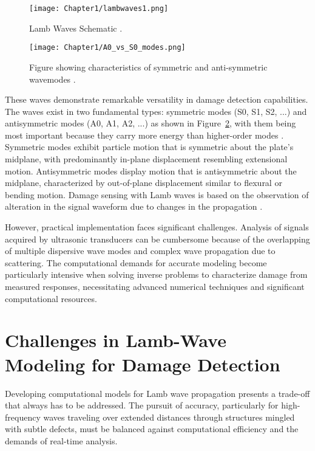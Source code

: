 \documentclass[12pt,a4paper]{report}
\begin{document}
\begin{figure}[htbp]
    \centering
    \texttt{[image: Chapter1/lambwaves1.png]}
    \caption{Lamb Waves Schematic \citep{rose2014ultrasonic}.}
    \label{fig:fig1}
\end{figure}

\begin{figure}[htbp]
    \centering
    \texttt{[image: Chapter1/A0\_vs\_S0\_modes.png]}
    \caption{Figure showing characteristics of symmetric and anti-symmetric wavemodes \citep{rose2014ultrasonic}.}
    \label{fig:S0andA0}
\end{figure}

\FloatBarrier   %

These waves demonstrate remarkable versatility in damage detection capabilities. The waves exist in two fundamental types: symmetric modes (S0, S1, S2, ...) and antisymmetric modes (A0, A1, A2, ...) as shown in Figure~\ref{fig:S0andA0}, with them being most important because they carry more energy than higher-order modes \citep{GIURGIUTIU2014293}. Symmetric modes exhibit particle motion that is symmetric about the plate's midplane, with predominantly in-plane displacement resembling extensional motion. Antisymmetric modes display motion that is antisymmetric about the midplane, characterized by out-of-plane displacement similar to flexural or bending motion. Damage sensing with Lamb waves is based on the observation of alteration in the signal waveform due to changes in the propagation  \citep{Muller2017}. 



However, practical implementation faces significant challenges. Analysis of signals acquired by ultrasonic transducers can be cumbersome because of the overlapping of multiple dispersive wave modes and complex wave propagation due to scattering. The computational demands for accurate modeling become particularly intensive when solving inverse problems to characterize damage from measured responses, necessitating advanced numerical techniques and significant computational resources.

\section{Challenges in Lamb-Wave Modeling for Damage Detection}
\label{challenges}

Developing computational models for Lamb wave propagation presents a trade-off that always has to be addressed. The pursuit of accuracy, particularly for high-frequency waves traveling over extended distances through structures mingled with subtle defects, must be balanced against computational efficiency and the demands of real-time analysis.
\end{document}
